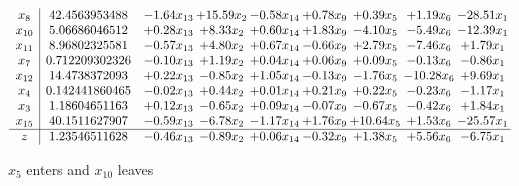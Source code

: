 \documentclass[9pt]{article}
\begin{document}
 \[\begin{array}{c| c c@{\hskip 2pt} c@{\hskip 2pt} c@{\hskip 2pt} c@{\hskip 2pt} c@{\hskip 2pt} c@{\hskip 2pt} c@{\hskip 2pt} }
 x_{8}   &  42.4563953488 & -1.64 x_{13} & + 15.59 x_{2} & -0.58 x_{14} & +  0.78 x_{9} & +  0.39 x_{5} & +  1.19 x_{6} & -28.51 x_{1}\\
 x_{10}   &  5.06686046512 & +  0.28 x_{13} & +  8.33 x_{2} & +  0.60 x_{14} & +  1.83 x_{9} & -4.10 x_{5} & -5.49 x_{6} & -12.39 x_{1}\\
 x_{11}   &  8.96802325581 & -0.57 x_{13} & +  4.80 x_{2} & +  0.67 x_{14} & -0.66 x_{9} & +  2.79 x_{5} & -7.46 x_{6} & +  1.79 x_{1}\\
 x_{7}   &  0.712209302326 & -0.10 x_{13} & +  1.19 x_{2} & +  0.04 x_{14} & +  0.06 x_{9} & +  0.09 x_{5} & -0.13 x_{6} & -0.86 x_{1}\\
 x_{12}   &  14.4738372093 & +  0.22 x_{13} & -0.85 x_{2} & +  1.05 x_{14} & -0.13 x_{9} & -1.76 x_{5} & -10.28 x_{6} & +  9.69 x_{1}\\
 x_{4}   &  0.142441860465 & -0.02 x_{13} & +  0.44 x_{2} & +  0.01 x_{14} & +  0.21 x_{9} & +  0.22 x_{5} & -0.23 x_{6} & -1.17 x_{1}\\
 x_{3}   &  1.18604651163 & +  0.12 x_{13} & -0.65 x_{2} & +  0.09 x_{14} & -0.07 x_{9} & -0.67 x_{5} & -0.42 x_{6} & +  1.84 x_{1}\\
 x_{15}   &  40.1511627907 & -0.59 x_{13} & -6.78 x_{2} & -1.17 x_{14} & +  1.76 x_{9} & + 10.64 x_{5} & +  1.53 x_{6} & -25.57 x_{1}\\
\hline
z    &  1.23546511628 & -0.46 x_{13} & -0.89 x_{2} & +  0.06 x_{14} & -0.32 x_{9} & +  1.38 x_{5} & +  5.56 x_{6} & -6.75 x_{1}\\
\end{array}\]


 $ x_{5} $ enters and $ x_{10} $ leaves 
\end{document}
